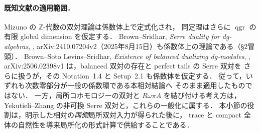 \paragraph{既知文献の適用範囲．}
Mizuno \cite[\S2 and Theorem~5.8]{MizunoZDuality} の
$\mathbb Z$-代数の双対理論は係数体上で定式化され，
同定理はさらに $\operatorname{qgr}$ の有限 global dimension を仮定する．
Brown--Sridhar, \emph{Serre duality for dg-algebras},
\cite{BrownSridharSerre}, arXiv:2410.07204v2（2025年8月15日）も係数体上の理論である（\S2冒頭）．
Brown--Soto Levins--Sridhar, \emph{Existence of balanced dualizing dg-modules},
\cite{BrownSotoSridharBalanced}, arXiv:2506.02398v1 は，balanced 双対の存在と perfect tails の Serre 双対を
さらに扱うが，その Notation~1.4 と Setup~2.1 も係数体を仮定する．
従って，いずれも次数零部分が一般の係数環である本相対結論へ
そのまま適用したものではない．
一方，局所コホモロジーの双対と $R\omega\pi A$ を結び付ける考え方は，
Yekutieli--Zhang の非可換 Serre 双対\cite{YZ}と，これらの一般化に属する．
本小節の役割は，明示した相対の\emph{両側}局所双対入力が得られた後に，
trace と compact 全体の自然性を導来局所化の形式計算で供給することである．

